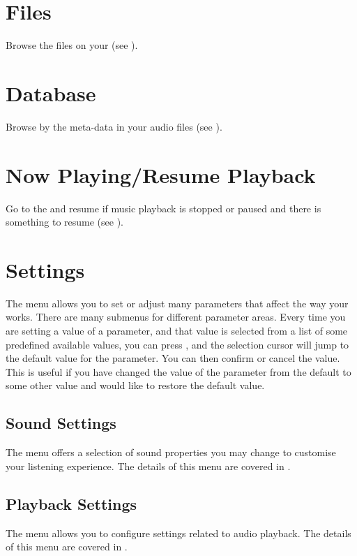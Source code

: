 \section{Files}
Browse the files on your \dap{} (see ).

\section{Database}
Browse by the meta-data in your audio files (see ).

\section{Now Playing/Resume Playback}
Go to the  and resume if music playback is
stopped or paused and there is something to resume (see ).

\section{Settings}

The  menu allows you to set or adjust many parameters that
affect the way your \dap{} works. There are many submenus for different
parameter areas. Every time you are setting a value of a parameter, and that
value is selected from a list of some predefined available values, you can press
\ActionStdContext, and the selection cursor will jump to the default value for
the parameter. You can then confirm or cancel the value. This is useful if you
have changed the value of the parameter from the default to some other value and
would like to restore the default value.

\subsection{Sound Settings}
The  menu offers a selection of sound properties you may 
change to customise your listening experience. The details of this menu are covered
in .

\subsection{Playback Settings}
The  menu allows you to configure settings related
to audio playback. The details of this menu are covered
in .

